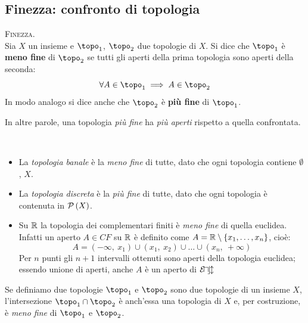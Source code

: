 \subsection{Finezza: confronto di topologia}
\begin{define}\textsc{Finezza.}\\
Sia $X$ un insieme e $\topo_1$, $\topo_2$ due topologie di $X$. Si dice che $\topo_1$ è \textbf{meno fine} di $\topo_2$ se tutti gli aperti della prima topologia sono aperti della seconda:
\vspace{-2mm}
\begin{equation}
\forall A\in\topo_1\implies A\in \topo_2
\end{equation}
In modo analogo si dice anche che $\topo_2$ è \textbf{più fine} di $\topo_1$.
\end{define}
In altre parole, una topologia \textit{più fine} ha \textit{più aperti} rispetto a quella confrontata.
\begin{examples}~{}
\begin{itemize}
\item La \textit{topologia banale} è la \textit{meno fine} di tutte, dato che ogni topologia contiene $\emptyset$, $X$.
\item La \textit{topologia discreta} è la \textit{più fine} di tutte, dato che ogni topologia è contenuta in $\mathcal{P}\left(X\right)$.
\item Su $\mathbb{R}$ la topologia dei complementari finiti è \textit{meno fine} di quella euclidea. Infatti un aperto $A\in CF$ su $\mathbb{R}$ è definito come $A=\mathbb{R}\setminus\left\{x_1,\ldots,x_n\right\}$, cioè:
\begin{equation*}
A=\left(-\infty,\ x_1\right)\cup\left(x_1,\ x_2\right)\cup\ldots\cup\left(x_n,\ +\infty\right)
\end{equation*}
Per $n$ punti gli $n+1$ intervalli ottenuti sono aperti della topologia euclidea; essendo unione di aperti, anche $A$ è un aperto di $\mathcal{E\! u\! c\! l}$
\end{itemize}
\vspace{-3mm}
\end{examples}
\begin{observe}\label{intersezionetopo}
	Se definiamo due topologie $\topo_1$ e $\topo_2$ sono due topologie di un insieme $X$, l'intersezione $\topo_1\cap\topo_2$ è anch'essa una topologia di $X$ e, per costruzione, è \textit{meno fine} di $\topo_1$ e $\topo_2$.
\end{observe}
